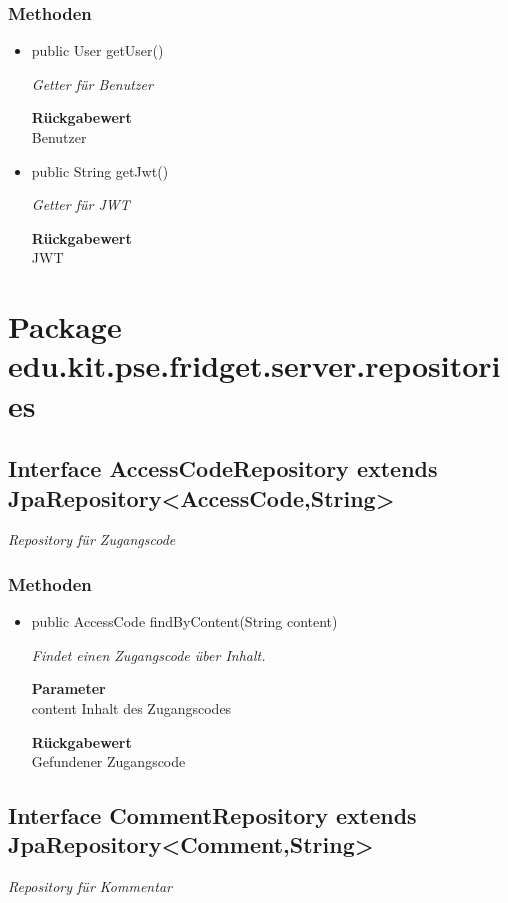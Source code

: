 \documentclass[a4paper]{scrreprt}
\begin{document}
        \subsubsection{Methoden}
        \begin{itemize}
        	\item{public User getUser()}
        	
        	\textit{Getter für Benutzer}
        	
        	
        	
        	\textbf{Rückgabewert} \\
        	Benutzer        \item{public String getJwt()}
        	
        	\textit{Getter für JWT}
        	
        	
        	
        	\textbf{Rückgabewert} \\
        	JWT
        \end{itemize}
        \section{Package edu.kit.pse.fridget.server.repositories}
        \subsection{Interface AccessCodeRepository extends JpaRepository<AccessCode,String>}
        \textit{Repository für Zugangscode}
        \subsubsection{Methoden}
        \begin{itemize}
        	\item{public AccessCode findByContent(String content)}
        	
        	\textit{Findet einen Zugangscode über Inhalt.}
        	
        	\textbf{Parameter} \\
        	content Inhalt des Zugangscodes
        	
        	\textbf{Rückgabewert} \\
        	Gefundener Zugangscode
        \end{itemize}
        \subsection{Interface CommentRepository extends JpaRepository<Comment,String>}
        \textit{Repository für Kommentar}
\end{document}
